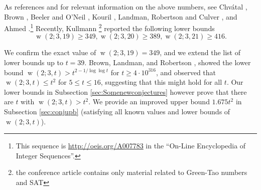 \documentclass[final,3p,times]{elsarticle}
\theoremstyle{definition}
\renewcommand{\leq}{\le} %
\DeclareMathOperator{\vdw}{w}
\begin{document}
As references and for relevant information on the above numbers,
see Chv\'atal \cite{chvatal1970}, Brown \cite{brown1974},
Beeler and O'Neil \cite{beelneil1979}, Kouril \cite{KourilPaulW26},
Landman, Robertson and Culver \cite{lrc2005}, and Ahmed \cite{ahmed2009, ahmed2010, ahmed2011, ahmed2013}.\footnote{This sequence is \url{http://oeis.org/A007783} in the ``On-Line Encyclopedia of Integer Sequences''.}
Recently, Kullmann \cite{kullmann0}\footnote{the conference article \cite{kullmann} contains only material related to Green-Tao numbers and SAT}
reported the following lower bounds
$$\vdw(2; 3, 19)\geq 349, \vdw(2; 3, 20)\geq 389, \vdw(2;3, 21)\geq 416.$$

We confirm the exact value of $\vdw(2; 3, 19) = 349$, and we extend
the list of lower bounds up to $t=39$. Brown, Landman, and Robertson \cite{blr2008},
showed the lower bound $\vdw(2; 3, t) > t^{2- 1 / \log \log t}$ for $t \geq 4 \cdot 10^{316}$, and
observed that $\vdw(2; 3, t)\leq t^2$ for $5\leq t\leq 16$, suggesting that this might hold for all $t$.
Our lower bounds in Subsection \ref{sec:Somenewconjectures} however prove that there are $t$ with  $\vdw(2; 3, t) > t^2$. We provide an improved upper bound $1.675 t^2$ in Subsection \ref{sec:conjupb} (satisfying all known values and lower bounds of $\vdw(2; 3, t)$).
\end{document}
